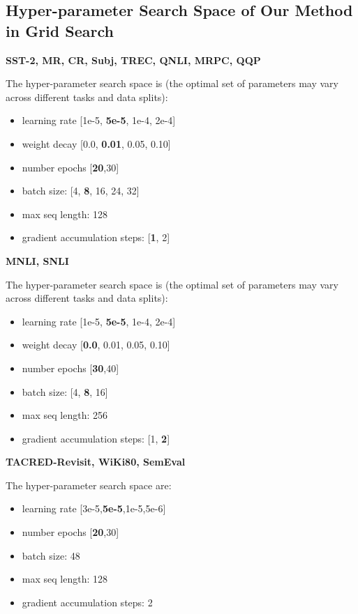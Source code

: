 \documentclass{article} \usepackage{iclr2022_conference,times}
\begin{document}
\subsection{Hyper-parameter Search Space of Our Method in Grid Search}
\label{app:hyper}

\textbf{SST-2, MR, CR, Subj, TREC, QNLI, MRPC, QQP}

The hyper-parameter search space is (the optimal set of parameters may vary across different tasks and data splits):
\begin{itemize}
\item learning rate
[1e-5, \textbf{5e-5}, 1e-4, 2e-4]
\item weight decay
[0.0, \textbf{0.01}, 0.05, 0.10]
\item number epochs [\textbf{20},30]
\item batch size: [4, \textbf{8}, 16, 24, 32]
\item max seq length: 128
\item gradient accumulation steps: [\textbf{1}, 2]
\end{itemize}

\textbf{MNLI, SNLI}

The hyper-parameter search space is (the optimal set of parameters may vary across different tasks and data splits):
\begin{itemize}
\item learning rate
[1e-5, \textbf{5e-5}, 1e-4, 2e-4]
\item weight decay
[\textbf{0.0}, 0.01, 0.05, 0.10]
\item number epochs [\textbf{30},40]
\item batch size: [4, \textbf{8}, 16]
\item max seq length: 256
\item gradient accumulation steps: [1, \textbf{2}]
\end{itemize}

\textbf{TACRED-Revisit, WiKi80, SemEval}

The hyper-parameter search space are:
\begin{itemize}
\item learning rate
[3e-5,\textbf{5e-5},1e-5,5e-6]
\item number epochs [\textbf{20},30]
\item batch size: 48
\item max seq length: 128
\item gradient accumulation steps: 2
\end{itemize}
\end{document}
